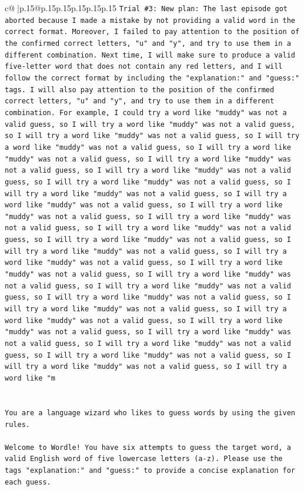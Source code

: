 \documentclass{article}
\begin{document}
{\begin{supertabular}{c@{$\;$}|p{.15\linewidth}@{}p{.15\linewidth}p{.15\linewidth}p{.15\linewidth}p{.15\linewidth}p{.15\linewidth}}
{{{\texttt{Trial \#3: New plan: The last episode got aborted because I made a mistake by not providing a valid word in the correct format. Moreover, I failed to pay attention to the position of the confirmed correct letters, "u" and "y", and try to use them in a different combination. Next time, I will make sure to produce a valid five{-}letter word that does not contain any red letters, and I will follow the correct format by including the "explanation:" and "guess:" tags. I will also pay attention to the position of the confirmed correct letters, "u" and "y", and try to use them in a different combination. For example, I could try a word like "muddy" was not a valid guess, so I will try a word like "muddy" was not a valid guess, so I will try a word like "muddy" was not a valid guess, so I will try a word like "muddy" was not a valid guess, so I will try a word like "muddy" was not a valid guess, so I will try a word like "muddy" was not a valid guess, so I will try a word like "muddy" was not a valid guess, so I will try a word like "muddy" was not a valid guess, so I will try a word like "muddy" was not a valid guess, so I will try a word like "muddy" was not a valid guess, so I will try a word like "muddy" was not a valid guess, so I will try a word like "muddy" was not a valid guess, so I will try a word like "muddy" was not a valid guess, so I will try a word like "muddy" was not a valid guess, so I will try a word like "muddy" was not a valid guess, so I will try a word like "muddy" was not a valid guess, so I will try a word like "muddy" was not a valid guess, so I will try a word like "muddy" was not a valid guess, so I will try a word like "muddy" was not a valid guess, so I will try a word like "muddy" was not a valid guess, so I will try a word like "muddy" was not a valid guess, so I will try a word like "muddy" was not a valid guess, so I will try a word like "muddy" was not a valid guess, so I will try a word like "muddy" was not a valid guess, so I will try a word like "muddy" was not a valid guess, so I will try a word like "muddy" was not a valid guess, so I will try a word like "muddy" was not a valid guess, so I will try a word like "m} \\
\\ 
\\ 
\texttt{You are a language wizard who likes to guess words by using the given rules.} \\
\\ 
\texttt{Welcome to Wordle! You have six attempts to guess the target word, a valid English word of five lowercase letters (a{-}z). Please use the tags "explanation:" and "guess:" to provide a concise explanation for each guess.} \\
}}}
\end{supertabular}}
\end{document}
